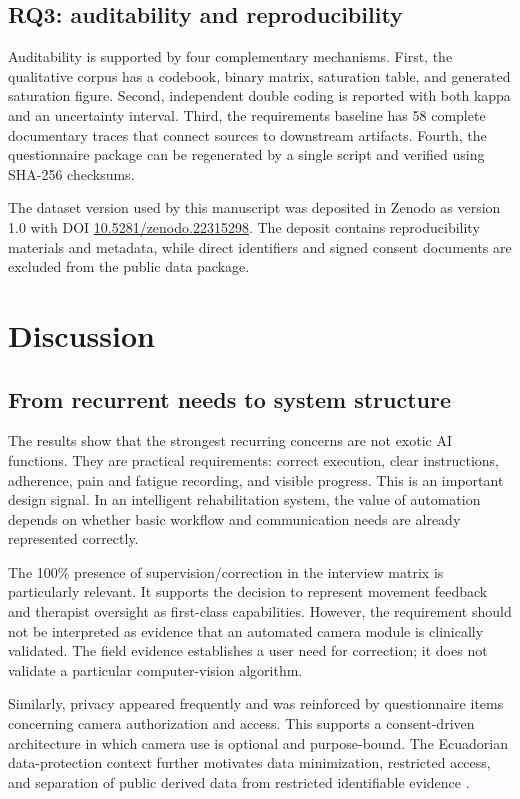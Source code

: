 \documentclass[10pt,a4paper]{article}
\begin{document}
\subsection{RQ3: auditability and reproducibility}
Auditability is supported by four complementary mechanisms. First, the qualitative corpus has a codebook, binary matrix, saturation table, and generated saturation figure. Second, independent double coding is reported with both kappa and an uncertainty interval. Third, the requirements baseline has 58 complete documentary traces that connect sources to downstream artifacts. Fourth, the questionnaire package can be regenerated by a single script and verified using SHA-256 checksums.

The dataset version used by this manuscript was deposited in Zenodo as version 1.0 with DOI \href{https://doi.org/10.5281/zenodo.22315298}{10.5281/zenodo.22315298}. The deposit contains reproducibility materials and metadata, while direct identifiers and signed consent documents are excluded from the public data package.

\section{Discussion}
\subsection{From recurrent needs to system structure}
The results show that the strongest recurring concerns are not exotic AI functions. They are practical requirements: correct execution, clear instructions, adherence, pain and fatigue recording, and visible progress. This is an important design signal. In an intelligent rehabilitation system, the value of automation depends on whether basic workflow and communication needs are already represented correctly.

The 100\% presence of supervision/correction in the interview matrix is particularly relevant. It supports the decision to represent movement feedback and therapist oversight as first-class capabilities. However, the requirement should not be interpreted as evidence that an automated camera module is clinically validated. The field evidence establishes a user need for correction; it does not validate a particular computer-vision algorithm.

Similarly, privacy appeared frequently and was reinforced by questionnaire items concerning camera authorization and access. This supports a consent-driven architecture in which camera use is optional and purpose-bound. The Ecuadorian data-protection context further motivates data minimization, restricted access, and separation of public derived data from restricted identifiable evidence \citep{ecuador2021lopdp}.
\end{document}
